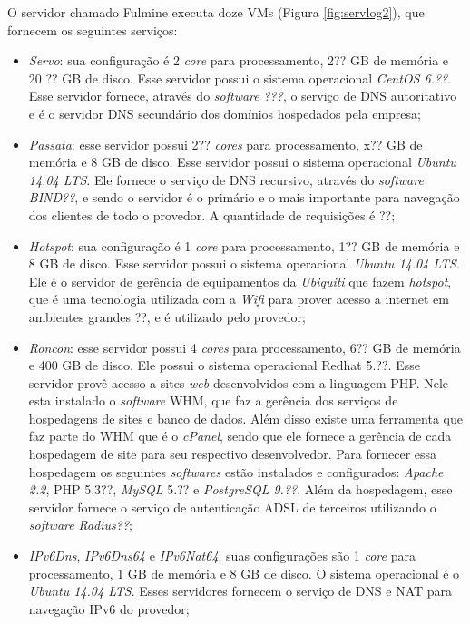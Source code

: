 O servidor chamado Fulmine executa doze \ac{VM}s (Figura \ref{fig:servlog2}), que fornecem os seguintes serviços:
\begin{itemize}
 \item \textit{Servo}: sua configuração é 2 \textit{core} para processamento, 2?? GB de memória e 20 ?? GB de disco. Esse servidor possui o 
 sistema operacional \textit{CentOS 6.??}. Esse servidor fornece, através do \textit{software} \textit{???}, o serviço de \ac{DNS} autoritativo 
 e é o servidor \ac{DNS} secundário dos domínios hospedados pela empresa;
 
 \item \textit{Passata}: esse servidor possui 2?? \textit{cores} para processamento, x?? GB de memória e 8 GB de disco. Esse servidor possui o 
 sistema operacional \textit{Ubuntu 14.04 \ac{LTS}}. Ele fornece o serviço de \ac{DNS} recursivo, através do \textit{software} \textit{BIND??}, 
 e sendo o servidor é o primário e o mais importante para navegação dos clientes de todo o provedor. A quantidade de requisições é ??;
 
 \item \textit{Hotspot}: sua configuração é 1 \textit{core} para processamento, 1?? GB de memória e 8 GB de disco. Esse servidor possui o 
 sistema operacional \textit{Ubuntu 14.04 \ac{LTS}}. Ele é o servidor de gerência de equipamentos da \textit{Ubiquiti} que fazem \textit{hotspot}, 
 que é uma tecnologia utilizada com a \textit{Wifi} para prover acesso a internet em ambientes grandes ??, e é utilizado pelo provedor;
 
 \item \textit{Roncon}: esse servidor possui 4 \textit{cores} para processamento, 6?? GB de memória e 400 GB de disco. Ele possui o sistema
 operacional Redhat 5.??. Esse servidor provê acesso a sites \textit{web} desenvolvidos com a linguagem \ac{PHP}. Nele esta instalado o 
 \textit{software} \ac{WHM}, que faz a gerência dos serviços de hospedagens de sites e banco de dados. Além disso existe uma ferramenta que 
 faz parte do \ac{WHM} que é o \textit{cPanel}, sendo que ele fornece a gerência de cada hospedagem de site para seu respectivo desenvolvedor.
 Para fornecer essa hospedagem os seguintes \textit{softwares} estão instalados e configurados: \textit{Apache 2.2}, \ac{PHP} 5.3??, 
 \textit{MySQL} 5.?? e \textit{PostgreSQL 9.??}.
 Além da hospedagem, esse servidor fornece o serviço de autenticação \ac{ADSL} de terceiros utilizando o \textit{software} \textit{Radius??};
 
 \item \textit{IPv6Dns}, \textit{IPv6Dns64} e \textit{IPv6Nat64}: suas configurações são 1 \textit{core} para processamento, 1 GB de memória e 
 8 GB de disco. O sistema operacional é o \textit{Ubuntu 14.04 \ac{LTS}}. Esses servidores fornecem o serviço de \ac{DNS} e \ac{NAT} para 
 navegação \ac{IPv6} do provedor;
 

\end{itemize}
